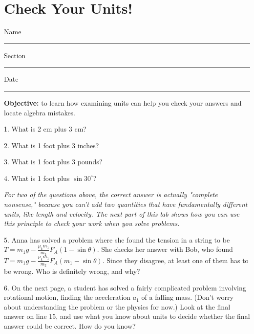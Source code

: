 \section{Check Your Units!}

Name \rule{2.0in}{0.1pt}\hfill{}Section \rule{1.0in}{0.1pt}\hfill{}Date
\rule{1.0in}{0.1pt}

\vspace{0.1in}
\textbf{Objective:} to learn how examining units can help you check your answers and locate algebra mistakes. 
\vspace{0.2in}

1. What is 2 cm plus 3 cm?
\vspace{0.3in}

2. What is 1 foot plus 3 inches?
\vspace{0.3in}

3. What is 1 foot plus 3 pounds?
\vspace{0.3in}

4. What is 1 foot plus $\sin 30 ^\circ $?
\vspace{0.3in}

\textit{For two of the questions above, the correct answer is actually "complete nonsense," because you can't add two quantities that have fundamentally different units, like length and velocity.  The next part of this lab shows how you can use this principle to check your work when you solve problems.}

5. Anna has solved a problem where she found the tension in a string to be $T = m_1g - \frac{\mu_k m_1}{m_2} F_A (1 - \sin\theta)$.  She checks her answer with Bob, who found $T = m_1g - \frac{\mu_k m_1}{m_2} F_A (m_1 - \sin\theta)$. Since they disagree, at least one of them has to be wrong.  Who is definitely wrong, and why?
\vspace{0.7in}

6. On the next page, a student has solved a fairly complicated problem involving rotational motion, finding the acceleration $a_1$ of a falling mass. (Don't worry about understanding the problem or the physics for now.)  Look at the final answer on line 15, and use what you know about units to decide whether the final answer could be correct.  How do you know?
\vspace{0.7in}

